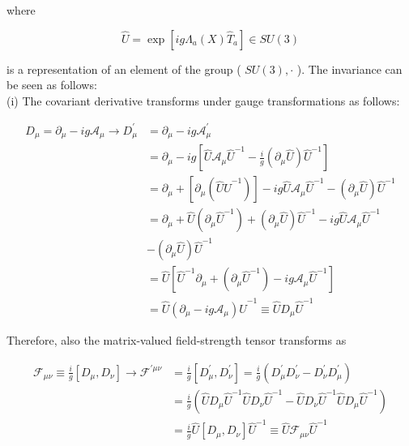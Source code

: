 \documentclass[10pt, letterpaper]{article}
\begin{document}
where

$$
\hat{U}=\exp \left[i g \Lambda_{a}(X) \hat{T}_{a}\right] \in S U(3)
$$

is a representation of an element of the group ( $S U(3), \cdot$ ). The invariance can be seen as follows:\\
(i) The covariant derivative transforms under gauge transformations as follows:

$$
\begin{aligned}
D_{\mu}=\partial_{\mu}-i g \mathcal{A}_{\mu} \longrightarrow D_{\mu}^{\prime} & =\partial_{\mu}-i g \mathcal{A}_{\mu}^{\prime} \\
& =\partial_{\mu}-i g\left[\hat{U} \mathcal{A}_{\mu} \hat{U}^{-1}-\frac{i}{g}\left(\partial_{\mu} \hat{U}\right) \hat{U}^{-1}\right] \\
& =\partial_{\mu}+\left[\partial_{\mu}\left(\hat{U} \hat{U}^{-1}\right)\right]-i g \hat{U} \mathcal{A}_{\mu} \hat{U}^{-1}-\left(\partial_{\mu} \hat{U}\right) \hat{U}^{-1} \\
& =\partial_{\mu}+\hat{U}\left(\partial_{\mu} \hat{U}^{-1}\right)+\left(\partial_{\mu} \hat{U}\right) \hat{U}^{-1}-i g \hat{U} \mathcal{A}_{\mu} \hat{U}^{-1} \\
& -\left(\partial_{\mu} \hat{U}\right) \hat{U}^{-1} \\
& =\hat{U}\left[\hat{U}^{-1} \partial_{\mu}+\left(\partial_{\mu} \hat{U}^{-1}\right)-i g \mathcal{A}_{\mu} \hat{U}^{-1}\right] \\
& =\hat{U}\left(\partial_{\mu}-i g \mathcal{A}_{\mu}\right) \hat{U}^{-1} \equiv \hat{U} D_{\mu} \hat{U}^{-1}
\end{aligned}
$$

Therefore, also the matrix-valued field-strength tensor transforms as

$$
\begin{aligned}
\mathcal{F}_{\mu \nu} \equiv \frac{i}{g}\left[D_{\mu}, D_{\nu}\right] \longrightarrow \mathcal{F}^{\prime \mu \nu} & =\frac{i}{g}\left[D_{\mu}^{\prime}, D_{\nu}^{\prime}\right]=\frac{i}{g}\left(D_{\mu}^{\prime} D_{\nu}^{\prime}-D_{\nu}^{\prime} D_{\mu}^{\prime}\right) \\
& =\frac{i}{g}\left(\hat{U} D_{\mu} \hat{U}^{-1} \hat{U} D_{\nu} \hat{U}^{-1}-\hat{U} D_{\nu} \hat{U}^{-1} \hat{U} D_{\mu} \hat{U}^{-1}\right) \\
& =\frac{i}{g} \hat{U}\left[D_{\mu}, D_{\nu}\right] \hat{U}^{-1} \equiv \hat{U} \mathcal{F}_{\mu \nu} \hat{U}^{-1}
\end{aligned}
$$
\end{document}
